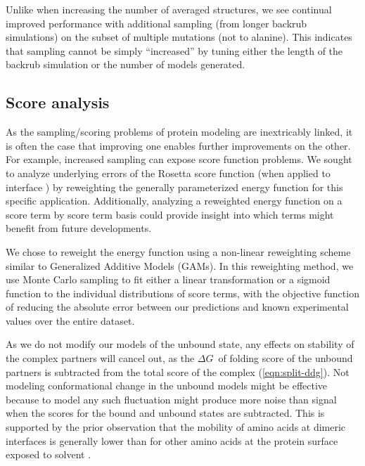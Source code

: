 Unlike when increasing the number of averaged structures, we see continual improved performance with additional sampling (from longer backrub simulations) on the subset of multiple mutations (not to alanine).
This indicates that sampling cannot be simply ``increased'' by tuning either the length of the backrub simulation or the number of models generated. %

\subsection{Score analysis}

As the sampling/scoring problems of protein modeling are inextricably linked, it is often the case that improving one enables further improvements on the other. For example, increased sampling can expose score function problems. %
We sought to analyze underlying errors of the Rosetta score function (when applied to interface \ddg) by reweighting the generally parameterized energy function for this specific application.
Additionally, analyzing a reweighted energy function on a score term by score term basis could provide insight into which terms might benefit from future developments.

We chose to reweight the energy function using a non-linear reweighting scheme similar to Generalized Additive Models (GAMs)\cite{wood_fast_2011}.
In this reweighting method, we use Monte Carlo sampling to fit either a linear transformation or a sigmoid function to the individual distributions of score terms, with the objective function of reducing the absolute error between our predictions and known experimental values over the entire dataset.

As we do not modify our models of the unbound state, any effects on stability of the complex partners will cancel out, as the $\Delta G$\ of folding score of the unbound partners is subtracted from the total score of the complex (\cref{eqn:split-ddg}).
Not modeling conformational change in the unbound models might be effective because to model any such fluctuation might produce more noise than signal when the scores for the bound and unbound states are subtracted.
This is supported by the prior observation that the mobility of amino acids at dimeric interfaces is generally lower than for other amino acids at the protein surface exposed to solvent \cite{zen_comparing_2010}.

